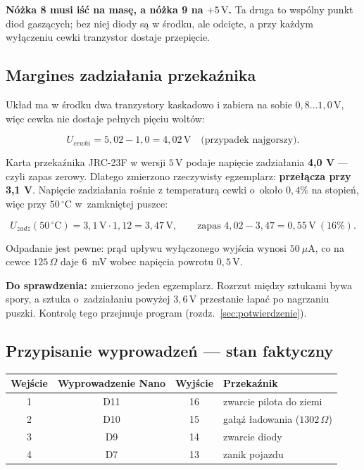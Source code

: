 \documentclass[a4paper,11pt]{article}
\newcommand{\ohm}{\,\Omega}
\newcommand{\volt}{\,\mathrm{V}}
\begin{document}
\textbf{Nóżka 8 musi iść na masę, a nóżka 9 na $+5\volt$.} Ta druga to wspólny
punkt diod gaszących; bez niej diody są w środku, ale odcięte, a przy każdym
wyłączeniu cewki tranzystor dostaje przepięcie.

\subsection{Margines zadziałania przekaźnika}

Układ ma w środku dwa tranzystory kaskadowo i zabiera na sobie $0{,}8\ldots1{,}0\volt$,
więc cewka nie dostaje pełnych pięciu woltów:

\[
U_{cewki}=5{,}02-1{,}0=4{,}02\volt \quad\text{(przypadek najgorszy)}.
\]

Karta przekaźnika JRC-23F w wersji $5\volt$ podaje napięcie zadziałania
\textbf{4,0 V} --- czyli zapas zerowy. Dlatego zmierzono rzeczywisty egzemplarz:
\textbf{przełącza przy 3,1 V}. Napięcie zadziałania rośnie z temperaturą cewki
o~około $0{,}4\%$ na stopień, więc przy $50\,^\circ$C w~zamkniętej puszce:

\[
U_{zadz}(50\,^\circ\mathrm{C})=3{,}1\volt\cdot1{,}12=3{,}47\volt,
\qquad
\text{zapas } 4{,}02-3{,}47=0{,}55\volt\ (16\%).
\]

Odpadanie jest pewne: prąd upływu wyłączonego wyjścia wynosi $50\ \mu\mathrm{A}$,
co na cewce $125\ohm$ daje $6$~mV wobec napięcia powrotu $0{,}5\volt$.

\textbf{Do sprawdzenia:} zmierzono jeden egzemplarz. Rozrzut między sztukami bywa
spory, a sztuka o~zadziałaniu powyżej $3{,}6\volt$ przestanie łapać po nagrzaniu
puszki. Kontrolę tego przejmuje program (rozdz.~\ref{sec:potwierdzenie}).

\subsection{Przypisanie wyprowadzeń --- stan faktyczny}

\begin{center}
\begin{tabular}{cccl}
\toprule
Wejście & Wyprowadzenie Nano & Wyjście & Przekaźnik \\
\midrule
1 & D11 & 16 & zwarcie pilota do ziemi \\
2 & D10 & 15 & gałąź ładowania ($1302\ohm$) \\
3 & D9  & 14 & zwarcie diody \\
4 & D7  & 13 & zanik pojazdu \\
\bottomrule
\end{tabular}
\end{center}
\end{document}
